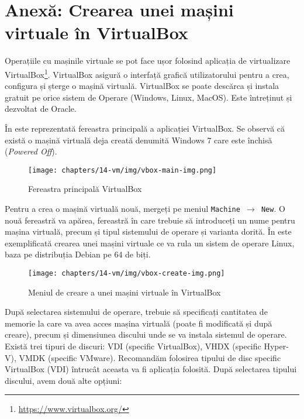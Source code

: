 \section{Anexă: Crearea unei mașini virtuale în VirtualBox}
\label{sec:vm:create-vbox}

Operațiile cu mașinile virtuale se pot face ușor folosind aplicația de
virtualizare VirtualBox\footnote{\url{https://www.virtualbox.org/}}. VirtualBox asigură o interfață grafică utilizatorului
pentru a crea, configura și șterge o mașină virtuală. VirtualBox se poate descărca și instala gratuit pe orice sistem de Operare
(Windows, Linux, MacOS). Este întreținut și dezvoltat de Oracle.

În  este reprezentată fereastra
principală a aplicației VirtualBox. Se observă că există o mașină virtuală deja
creată denumită Windows 7 care este închisă (\textit{Powered Off}).

\begin{figure}[!htbp]
  \centering
  \texttt{[image: chapters/14-vm/img/vbox-main-img.png]}
  \caption{Fereastra principală VirtualBox}
  \label{fig:vm:vbox-main}
\end{figure}

Pentru a crea o mașină virtuală nouă, mergeți pe meniul \texttt{Machine $\rightarrow$ New}. O nouă
fereastră va apărea, fereastră în care trebuie să introduceți un nume pentru mașina
virtuală, precum și tipul sistemului de operare și varianta dorită. În
 este exemplificată crearea unei
mașini virtuale ce va rula un sistem de operare Linux, baza pe distribuția
Debian pe 64 de biți.

\begin{figure}[!htbp]
  \centering
  \texttt{[image: chapters/14-vm/img/vbox-create-img.png]}
  \caption{Meniul de creare a unei mașini virtuale în VirtualBox}
  \label{fig:vm:vbox-create}
\end{figure}

După selectarea sistemului de operare, trebuie să specificați cantitatea de
memorie la care va avea acces mașina virtuală (poate fi modificată și după
creare), precum și dimensiunea discului unde se va instala sistemul de operare.
Există trei tipuri de discuri: VDI (specific VirtualBox), VHDX (specific
Hyper-V), VMDK (specific VMware). Recomandăm folosirea tipului de disc specific
VirtualBox (VDI) întrucât aceasta va fi aplicația folosită. După selectarea
tipului discului, avem două alte opțiuni:

